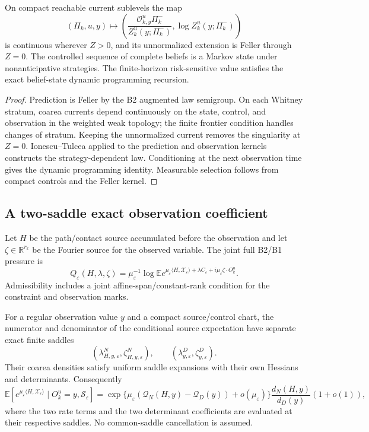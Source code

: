 \begin{theorem}
\label{thm:r9-c1-belief}
On compact reachable current sublevels the map
\[
 (\Pi_k,u,y)
 \longmapsto
 \left(
 \frac{\mathcal O_{k,y}^u\Pi_k^-}
      {Z_k^u(y;\Pi_k^-)},
 \log Z_k^u(y;\Pi_k^-)
 \right)
\]
is continuous wherever $Z>0$, and its unnormalized extension is Feller
through $Z=0$.  The controlled sequence of complete beliefs is a Markov state
under nonanticipative strategies.  The finite-horizon risk-sensitive value
satisfies the exact belief-state dynamic programming recursion.
\end{theorem}

\begin{proof}
Prediction is Feller by the B2 augmented law semigroup.  On each Whitney
stratum, coarea currents depend continuously on the state, control, and
observation in the weighted weak topology; the finite frontier condition
handles changes of stratum.  Keeping the unnormalized current removes the
singularity at $Z=0$.  Ionescu--Tulcea applied to the prediction and
observation kernels constructs the strategy-dependent law.  Conditioning at
the next observation time gives the dynamic programming identity.  Measurable
selection follows from compact controls and the Feller kernel.
\end{proof}

\subsection{A two-saddle exact observation coefficient}

Let $H$ be the path/contact source accumulated before the observation and let
$\zeta\in\mathbb R^{r_k}$ be the Fourier source for the observed variable.
The joint full B2/B1 pressure is
\[
 Q_\varepsilon(H,\lambda,\zeta)
 =\mu_\varepsilon^{-1}\log
 \mathbb E
 e^{\mu_\varepsilon\langle H,\mathcal X_\varepsilon\rangle
 +\lambda C_\varepsilon+i\mu_\varepsilon\zeta\cdot O_k^u}.
\]
Admissibility includes a joint affine-span/constant-rank condition for the
constraint and observation marks.

\begin{theorem}
\label{thm:r9-c1-coefficient}
For a regular observation value $y$ and a compact source/control chart, the
numerator and denominator of the conditional source expectation have
separate exact finite saddles
\[
 (\lambda^N_{H,y,\varepsilon},\zeta^N_{H,y,\varepsilon}),
 \qquad
 (\lambda^D_{y,\varepsilon},\zeta^D_{y,\varepsilon}).
\]
Their coarea densities satisfy uniform saddle expansions with their own
Hessians and determinants.  Consequently
\[
 \mathbb E\left[e^{\mu_\varepsilon\langle H,
 \mathcal X_\varepsilon\rangle}
 \mid O_k^u=y,\mathcal S_\varepsilon\right]
 =\exp\{\mu_\varepsilon(\mathcal Q_N(H,y)-\mathcal Q_D(y))+o(\mu_\varepsilon)\}
 \frac{d_N(H,y)}{d_D(y)}(1+o(1)),
\]
where the two rate terms and the two determinant coefficients are evaluated at
their respective saddles.  No common-saddle cancellation is assumed.
\end{theorem}

